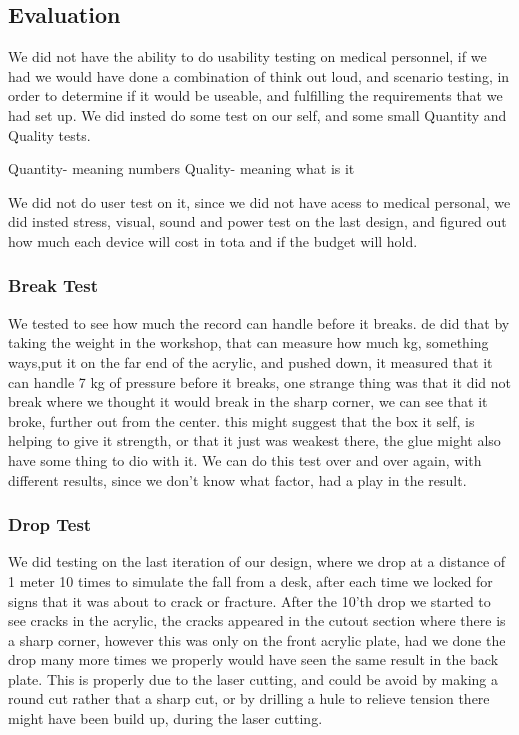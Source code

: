 \subsection{Evaluation}
We did not have the ability to do usability testing on medical personnel, if we had we would have done a combination of think out loud, and scenario testing, in order to determine if it would be useable, and fulfilling the requirements that we had set up.
We did insted do some test on our self, and some small Quantity and Quality tests.


Quantity- meaning numbers
Quality- meaning what is it 

We did not do user test on it, since we did not have acess to medical personal, we did insted stress, visual, sound and power test on the last design, and figured out how much each device will cost in tota and if the budget will hold.

\subsubsection{Break Test}
We tested to see how much the record can handle before it breaks.
de did that by taking the weight in the workshop, that can measure how much kg, something ways,put it on the far end of the acrylic, and pushed down, it measured that it can handle 7 kg of pressure before it breaks, one strange thing was that it did not break where we thought it would break in the sharp corner, we can see that it broke, further out from the center.
this might suggest that the box it self, is helping to give it strength, or that it just was weakest there, the glue might also have some thing to dio with it.
We can do this test over and over again, with different results, since we don't know what factor, had a play in the result.

\subsubsection{Drop Test}
We did testing on the last iteration of our design, where we drop at a distance of 1 meter 10 times to simulate the fall from a desk, after each time we locked for signs that it was about to crack or fracture.
After the 10'th drop we started to see cracks in the acrylic, the cracks appeared in the cutout section where there is a sharp corner, however this was only on the front acrylic plate, had we done the drop many more times we properly would have seen the same result in the back plate.
This is properly due to the laser cutting, and could be avoid by making a round cut rather that a sharp cut, or by drilling a hule to relieve tension there might have been build up, during the laser cutting.

